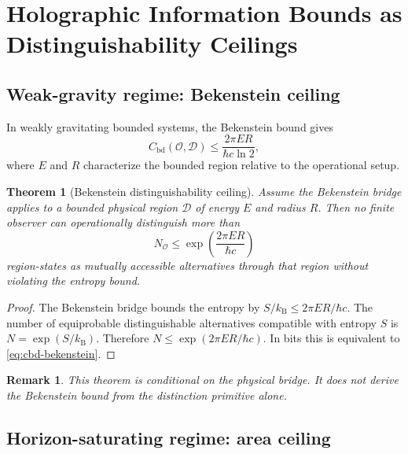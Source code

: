 \documentclass[10pt,a4paper,twocolumn,aps,prl]{revtex4-2}
\newtheorem{theorem}{Theorem}
\newtheorem{remark}{Remark}
\newcommand{\Obs}{\mathcal{O}}
\newcommand{\Patch}{\mathcal{D}}
\newcommand{\kB}{k_{\mathrm B}}
\newcommand{\NA}{N_{\Obs}}
\begin{document}
\section{Holographic Information Bounds as Distinguishability Ceilings}

\subsection{Weak-gravity regime: Bekenstein ceiling}

In weakly gravitating bounded systems, the Bekenstein bound gives
\begin{equation}
C_{\mathrm{bd}}(\Obs,\Patch)\leq \frac{2\pi E R}{\hbar c\ln2},
\label{eq:cbd-bekenstein}
\end{equation}
where $E$ and $R$ characterize the bounded region relative to the operational setup.

\begin{theorem}[Bekenstein distinguishability ceiling]
Assume the Bekenstein bridge applies to a bounded physical region $\Patch$ of energy $E$ and radius $R$. Then no finite observer can operationally distinguish more than
\begin{equation}
\NA \leq \exp\left(\frac{2\pi E R}{\hbar c}\right)
\end{equation}
region-states as mutually accessible alternatives through that region without violating the entropy bound.
\end{theorem}

\begin{proof}
The Bekenstein bridge bounds the entropy by $S/\kB\leq 2\pi ER/\hbar c$. The number of equiprobable distinguishable alternatives compatible with entropy $S$ is $N=\exp(S/\kB)$. Therefore $N\leq \exp(2\pi ER/\hbar c)$. In bits this is equivalent to \eqref{eq:cbd-bekenstein}.
\end{proof}

\begin{remark}
This theorem is conditional on the physical bridge. It does not derive the Bekenstein bound from the distinction primitive alone.
\end{remark}

\subsection{Horizon-saturating regime: area ceiling}
\end{document}
